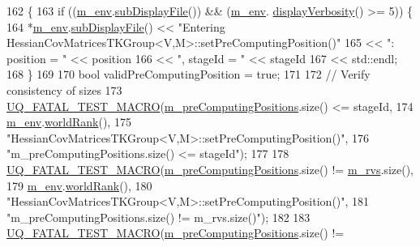 \begin{DoxyCode}
162 \{
163   \textcolor{keywordflow}{if} ((\hyperlink{class_q_u_e_s_o_1_1_base_t_k_group_a2bce5e8aa5c844d4332a0e73cf00a1f9}{m\_env}.\hyperlink{class_q_u_e_s_o_1_1_base_environment_a8a0064746ae8dddfece4229b9ad374d6}{subDisplayFile}()) && (\hyperlink{class_q_u_e_s_o_1_1_base_t_k_group_a2bce5e8aa5c844d4332a0e73cf00a1f9}{m\_env}.
      \hyperlink{class_q_u_e_s_o_1_1_base_environment_a1fe5f244fc0316a0ab3e37463f108b96}{displayVerbosity}() >= 5)) \{
164     *\hyperlink{class_q_u_e_s_o_1_1_base_t_k_group_a2bce5e8aa5c844d4332a0e73cf00a1f9}{m\_env}.\hyperlink{class_q_u_e_s_o_1_1_base_environment_a8a0064746ae8dddfece4229b9ad374d6}{subDisplayFile}() << \textcolor{stringliteral}{"Entering
       HessianCovMatricesTKGroup<V,M>::setPreComputingPosition()"}
165                            << \textcolor{stringliteral}{": position = "} << position
166                            << \textcolor{stringliteral}{", stageId = "}  << stageId
167                            << std::endl;
168   \}
169 
170   \textcolor{keywordtype}{bool} validPreComputingPosition = \textcolor{keyword}{true};
171 
172   \textcolor{comment}{// Verify consistency of sizes}
173   \hyperlink{_defines_8h_a56d63d18d0a6d45757de47fcc06f574d}{UQ\_FATAL\_TEST\_MACRO}(\hyperlink{class_q_u_e_s_o_1_1_base_t_k_group_a93d7fe55e30a7c6f209b01cb8a67e322}{m\_preComputingPositions}.size() <= stageId,
174                       \hyperlink{class_q_u_e_s_o_1_1_base_t_k_group_a2bce5e8aa5c844d4332a0e73cf00a1f9}{m\_env}.\hyperlink{class_q_u_e_s_o_1_1_base_environment_a78b57112bbd0e6dd0e8afec00b40ffa7}{worldRank}(),
175                       \textcolor{stringliteral}{"HessianCovMatricesTKGroup<V,M>::setPreComputingPosition()"},
176                       \textcolor{stringliteral}{"m\_preComputingPositions.size() <= stageId"});
177 
178   \hyperlink{_defines_8h_a56d63d18d0a6d45757de47fcc06f574d}{UQ\_FATAL\_TEST\_MACRO}(\hyperlink{class_q_u_e_s_o_1_1_base_t_k_group_a93d7fe55e30a7c6f209b01cb8a67e322}{m\_preComputingPositions}.size() != 
      \hyperlink{class_q_u_e_s_o_1_1_base_t_k_group_a87c6b02ea45ab3de634c22afa58f53a5}{m\_rvs}.size(),
179                       \hyperlink{class_q_u_e_s_o_1_1_base_t_k_group_a2bce5e8aa5c844d4332a0e73cf00a1f9}{m\_env}.\hyperlink{class_q_u_e_s_o_1_1_base_environment_a78b57112bbd0e6dd0e8afec00b40ffa7}{worldRank}(),
180                       \textcolor{stringliteral}{"HessianCovMatricesTKGroup<V,M>::setPreComputingPosition()"},
181                       \textcolor{stringliteral}{"m\_preComputingPositions.size() != m\_rvs.size()"});
182 
183   \hyperlink{_defines_8h_a56d63d18d0a6d45757de47fcc06f574d}{UQ\_FATAL\_TEST\_MACRO}(\hyperlink{class_q_u_e_s_o_1_1_base_t_k_group_a93d7fe55e30a7c6f209b01cb8a67e322}{m\_preComputingPositions}.size() != 

\end{DoxyCode}
